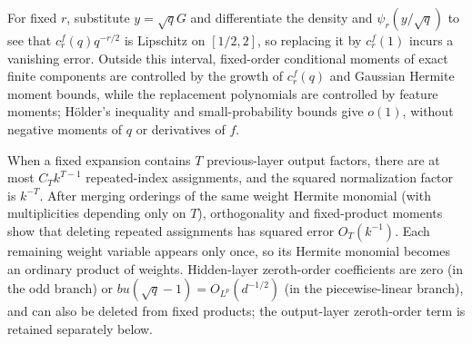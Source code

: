 \documentclass[a4paper]{tufte-handout}
\begin{document}
\begin{fullwidth}
For fixed $r$, substitute $y=\sqrt qG$ and differentiate the density and $\psi_r(y/\sqrt q)$ to see that
$c_r^f(q)q^{-r/2}$ is Lipschitz on $[1/2,2]$, so replacing it by $c_r^f(1)$ incurs a vanishing error. Outside this interval, fixed-order conditional moments of exact finite components are controlled by the growth of $c_r^f(q)$ and
Gaussian Hermite moment bounds, while the replacement polynomials are controlled by feature moments; H\"older's inequality and small-probability bounds
give $o(1)$, without negative moments of $q$ or derivatives of $f$.

When a fixed expansion contains $T$ previous-layer output factors, there are at most $C_Tk^{T-1}$ repeated-index assignments,
and the squared normalization factor is $k^{-T}$. After merging orderings of the same weight Hermite monomial
(with multiplicities depending only on $T$), orthogonality and fixed-product moments show that deleting repeated assignments has squared error $O_T(k^{-1})$.
Each remaining weight variable appears only once, so its Hermite monomial becomes an ordinary product of weights.
Hidden-layer zeroth-order coefficients are zero (in the odd branch) or $bu(\sqrt q-1)=O_{L^p}(d^{-1/2})$
(in the piecewise-linear branch), and can also be deleted from fixed products; the output-layer zeroth-order term is retained separately below.


\end{fullwidth}
\end{document}
